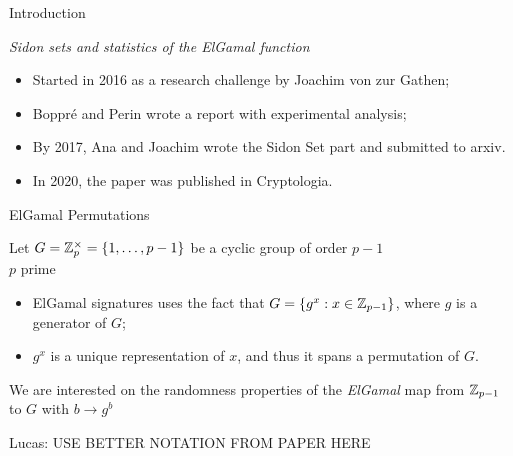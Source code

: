 
\begin{frame}{Introduction}
    \begin{center}
        \emph{Sidon sets and statistics of the ElGamal function} \\
        \citet*{boppre2020sidon}
    \end{center}
    
    \begin{itemize}
        \item Started in 2016 as a research challenge by Joachim von zur Gathen;
        \item Boppré and Perin wrote a report with experimental analysis;
        \item By 2017, Ana and Joachim wrote the Sidon Set part and submitted to arxiv.
        \item In 2020, the paper was published in Cryptologia.
    \end{itemize}
\end{frame}


\begin{frame}{ElGamal Permutations}

    Let $G = \mathbb{Z}_p^\times = \{1, \ldots, p-1\}$ be a cyclic group of order $p-1$\\
    $p$ prime

    \pause
    \begin{itemize}
        \item ElGamal signatures uses the fact that $G = \{ g^x : x\in \mathbb{Z}_{p-1}\}$, where $g$ is a generator of $G$;
        \item $g^x$ is a unique representation of $x$, and thus it spans a permutation of $G$.
    \end{itemize}
    \pause
    We are interested on the randomness properties of the \emph{ElGamal} map from $\mathbb{Z}_{p-1}$ to $G$ with $b \to g^b $
    
    Lucas: USE BETTER NOTATION FROM PAPER HERE
\end{frame}

